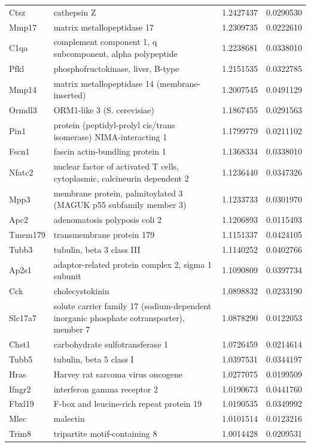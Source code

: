 \documentclass[onehalf,12pt]{beavtex}
\begin{document}
\begin{landscape}
\begin{longtable}{llrr}
  Ctsz & cathepsin Z & 1.2427437 & 0.0290530\\
  \addlinespace
  Mmp17 & matrix metallopeptidase 17 & 1.2309735 & 0.0222610\\
  C1qa & complement component 1, q subcomponent, alpha polypeptide & 1.2238681 & 0.0338010\\
  Pfkl & phosphofructokinase, liver, B-type & 1.2151535 & 0.0322785\\
  Mmp14 & matrix metallopeptidase 14 (membrane-inserted) & 1.2007545 & 0.0491129\\
  Ormdl3 & ORM1-like 3 (S. cerevisiae) & 1.1867455 & 0.0291563\\
  \addlinespace
  Pin1 & protein (peptidyl-prolyl cis/trans isomerase) NIMA-interacting 1 & 1.1799779 & 0.0211102\\
  Fscn1 & fascin actin-bundling protein 1 & 1.1368334 & 0.0338010\\
  Nfatc2 & nuclear factor of activated T cells, cytoplasmic, calcineurin dependent 2 & 1.1236440 & 0.0347326\\
  Mpp3 & membrane protein, palmitoylated 3 (MAGUK p55 subfamily member 3) & 1.1233733 & 0.0301970\\
  Apc2 & adenomatosis polyposis coli 2 & 1.1206893 & 0.0115493\\
  \addlinespace
  Tmem179 & transmembrane protein 179 & 1.1151337 & 0.0424105\\
  Tubb3 & tubulin, beta 3 class III & 1.1140252 & 0.0402766\\
  Ap2s1 & adaptor-related protein complex 2, sigma 1 subunit & 1.1090809 & 0.0397734\\
  Cck & cholecystokinin & 1.0898832 & 0.0233190\\
  Slc17a7 & solute carrier family 17 (sodium-dependent inorganic phosphate cotransporter), member 7 & 1.0878290 & 0.0122053\\
  \addlinespace
  Chst1 & carbohydrate sulfotransferase 1 & 1.0726459 & 0.0214614\\
  Tubb5 & tubulin, beta 5 class I & 1.0397531 & 0.0344197\\
  Hras & Harvey rat sarcoma virus oncogene & 1.0277075 & 0.0199509\\
  Ifngr2 & interferon gamma receptor 2 & 1.0190673 & 0.0441760\\
  Fbxl19 & F-box and leucine-rich repeat protein 19 & 1.0190535 & 0.0349992\\
  \addlinespace
  Mlec & malectin & 1.0101514 & 0.0123216\\
  Trim8 & tripartite motif-containing 8 & 1.0014428 & 0.0209531\\

\end{longtable}
\end{landscape}
\end{document}

